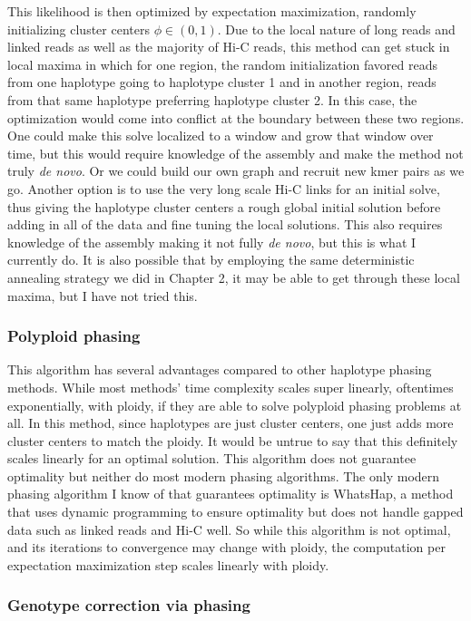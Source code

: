 \par{
This likelihood is then optimized by expectation maximization, randomly initializing cluster centers $\phi \in (0,1)$. Due to the local nature of long reads and linked reads as well as the majority of Hi-C reads, this method can get stuck in local maxima in which for one region, the random initialization favored reads from one haplotype going to haplotype cluster 1 and in another region, reads from that same haplotype preferring haplotype cluster 2. In this case, the optimization would come into conflict at the boundary between these two regions. One could make this solve localized to a window and grow that window over time, but this would require knowledge of the assembly and make the method not truly \textit{de novo}. Or we could build our own graph and recruit new kmer pairs as we go. Another option is to use the very long scale Hi-C links for an initial solve, thus giving the haplotype cluster centers a rough global initial solution before adding in all of the data and fine tuning the local solutions. This also requires knowledge of the assembly making it not fully \textit{de novo}, but this is what I currently do. It is also possible that by employing the same deterministic annealing strategy we did in Chapter 2, it may be able to get through these local maxima, but I have not tried this.
}
\subsubsection{Polyploid phasing}
\par{
This algorithm has several advantages compared to other haplotype phasing methods. While most methods' time complexity scales super linearly, oftentimes exponentially, with ploidy, if they are able to solve polyploid phasing problems at all. In this method, since haplotypes are just cluster centers, one just adds more cluster centers to match the ploidy. It would be untrue to say that this definitely scales linearly for an optimal solution. This algorithm does not guarantee optimality but neither do most modern phasing algorithms. The only modern phasing algorithm I know of that guarantees optimality is WhatsHap, a method that uses dynamic programming to ensure optimality but does not handle gapped data such as linked reads and Hi-C well\cite{whatshap}. So while this algorithm is not optimal, and its iterations to convergence may change with ploidy, the computation per expectation maximization step scales linearly with ploidy.
}
\subsubsection{Genotype correction via phasing}

